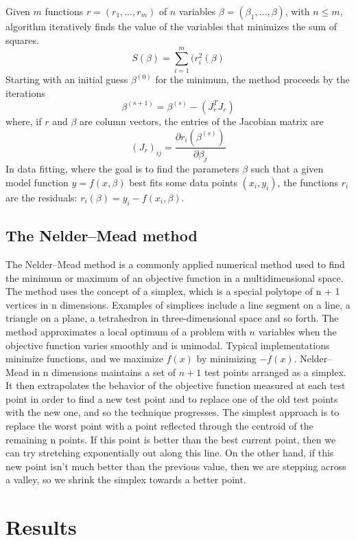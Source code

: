 \documentclass[a4paper,article,14pt]{extarticle}
\begin{document}
	Given $m$ functions $r = (r_1, \dotso, r_m)$ of $n$ variables $\beta = (\beta_1, \dotso, \beta)$, with $n \leq m$, algorithm iteratively finds the value of the variables that minimizes the sum of squares.
	$$S(\beta) = \sum\limits_{i=1}^m(r^2_i(\beta)$$
	Starting with an initial guess $\beta^{(0)}$ for the minimum, the method proceeds by the iterations $$\beta^{(s+1)} = \beta^{(s)} - (J_r^T J_r)$$
	where, if $r$ and $\beta$ are column vectors, the entries of the Jacobian matrix are
	$$(J_r)_{ij}=\frac{\partial r_i(\beta^{(s)})}{\partial \beta_j}$$
    In data fitting, where the goal is to find the parameters $\beta$ such that a given model function $y = f(x, \beta)$ best fits some data points $(x_i, y_i)$, the functions $r_i$ are the residuals: $r_i(\beta) = y_i - f(x_i, \beta)$.

	\subsection{The Nelder–Mead method}
	
	The Nelder–Mead method is a commonly applied numerical method used to find the minimum or maximum of an objective function in a multidimensional space. The method uses the concept of a simplex, which is a special polytope of n + 1 vertices in n dimensions. Examples of simplices include a line segment on a line, a triangle on a plane, a tetrahedron in three-dimensional space and so forth. The method approximates a local optimum of a problem with $n$ variables when the objective function varies smoothly and is unimodal. Typical implementations minimize functions, and we maximize $f(x)$ by minimizing $-f(x)$. Nelder–Mead in n dimensions maintains a set of $n + 1$ test points arranged as a simplex. It then extrapolates the behavior of the objective function measured at each test point in order to find a new test point and to replace one of the old test points with the new one, and so the technique progresses. The simplest approach is to replace the worst point with a point reflected through the centroid of the remaining n points. If this point is better than the best current point, then we can try stretching exponentially out along this line. On the other hand, if this new point isn't much better than the previous value, then we are stepping across a valley, so we shrink the simplex towards a better point.
	
	\section{Results}
	
\end{document}
